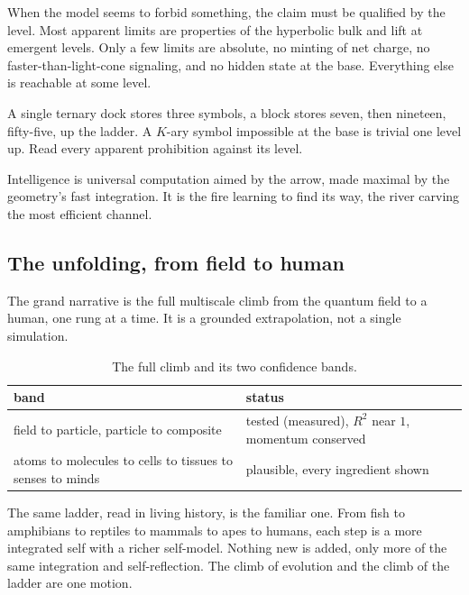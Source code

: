 When the model seems to forbid something, the claim must be qualified by the level. Most apparent limits are properties of the hyperbolic bulk and lift at emergent levels. Only a few limits are absolute, no minting of net charge, no faster-than-light-cone signaling, and no hidden state at the base. Everything else is reachable at some level.

\begin{principle}
A single ternary dock stores three symbols, a block stores seven, then nineteen, fifty-five, up the ladder. A $K$-ary symbol impossible at the base is trivial one level up. Read every apparent prohibition against its level.
\end{principle}

\begin{principle}
Intelligence is universal computation aimed by the arrow, made maximal by the geometry's fast integration. It is the fire learning to find its way, the river carving the most efficient channel.
\end{principle}

\subsection{The unfolding, from field to human}

The grand narrative is the full multiscale climb from the quantum field to a human, one rung at a time. It is a grounded extrapolation, not a single simulation.

\begin{table}[ht]
\centering
\begin{tabular}{@{}ll@{}}
\toprule
band & status \\
\midrule
field to particle, particle to composite & tested (measured), $R^2$ near $1$, momentum conserved \\
atoms to molecules to cells to tissues to senses to minds & plausible, every ingredient shown \\
\bottomrule
\end{tabular}
\caption{The full climb and its two confidence bands.}
\label{tab:unfolding}
\end{table}

The same ladder, read in living history, is the familiar one. From fish to amphibians to reptiles to mammals to apes to humans, each step is a more integrated self with a richer self-model. Nothing new is added, only more of the same integration and self-reflection. The climb of evolution and the climb of the ladder are one motion.

